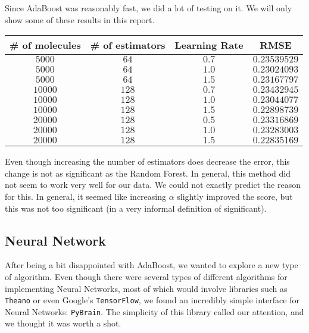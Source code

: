 \documentclass[10pt]{article}
\begin{document}
\medskip

Since AdaBoost was reasonably fast, we did a lot of testing on it. We will
only show some of these results in this report.

\medskip

\begin{center}

\begin{tabular}[center]{|c|c|c|c|}
\hline
\# of molecules & \# of estimators & Learning Rate &  RMSE \\
\hline
$5000$ & $64$ & $0.7$ & $0.23539529$ \\
\hline 
$5000$ & $64$ & $1.0$ & $0.23024093$ \\
\hline 
$5000$ & $64$ & $1.5$ &  $0.23167797$ \\
\hline 
$10000$ & $128$ & $0.7$ & $0.23432945$ \\
\hline 
$10000$ & $128$ & $1.0$ & $0.23044077$ \\
\hline 
$10000$ & $128$ & $1.5$ & $0.22898739$ \\
\hline 
$20000$ & $128$ & $0.5$  & $0.23316869$ \\
\hline 
$20000$ & $128$ & $1.0$ & $0.23283003$ \\
\hline
$20000$ & $128$ & $1.5$ & $0.22835169$ \\
\hline
\end{tabular}

\end{center}

\medskip

Even though increasing the number of estimators does decrease the error, this
change is not as significant as the Random Forest. In general, this method 
did not seem to work very well for our data. We could not exactly predict
the reason for this. In general, it seemed like increasing $\alpha$ slightly
improved the score, but this was not too significant (in a very informal
definition of significant).

\subsection{Neural Network}

After being a bit disappointed with AdaBoost, we wanted to explore a new
type of algorithm. Even though there were several types of different algorithms
for implementing Neural Networks, most of which would involve libraries such
as \verb|Theano| or even Google's \verb|TensorFlow|, we found an incredibly simple interface
for Neural Networks: \verb|PyBrain|. The simplicity of this library called our attention, and
we thought it was worth a shot. 
\end{document}
